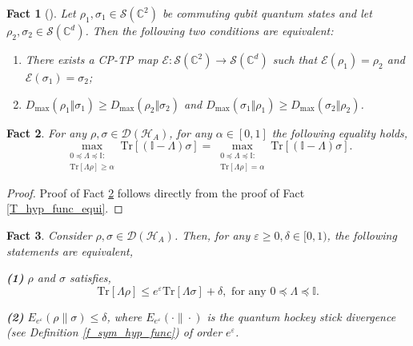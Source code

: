 \documentclass[onecolumn,ldraftcls, 11pt]{IEEEtran}
\newtheorem{fact}{Fact}
\newcommand{\tr}{\mathrm{Tr}}
\newcommand{\eps}{\varepsilon}
\newcommand*{\bbI}{\mathbb{I}}
\newcommand*{\cH}{\mathcal{H}}
\newcommand*{\cD}{\mathcal{D}}
\begin{document}
\begin{fact}[{\cite[Lemma $3.1$]{BST2019}}]\label{fact_state_trans}
Let $\rho_1, \sigma_1 \in \mathcal{S}(\mathbb{C}^2)$ be commuting qubit quantum states and 
let $\rho_2, \sigma_2 \in \mathcal{S}(\mathbb{C}^d)$.  
Then the following two conditions are equivalent:
\begin{enumerate}
    \item There exists a CP-TP map $\mathcal{E} : \mathcal{S}(\mathbb{C}^2) \to \mathcal{S}(\mathbb{C}^d)$ such that 
    $\mathcal{E}(\rho_1) = \rho_2$ and $\mathcal{E}(\sigma_1) = \sigma_2$;
    \item $D_{\max}(\rho_1 \Vert \sigma_1) \ge D_{\max}(\rho_2 \Vert \sigma_2)$ 
    and $D_{\max}(\sigma_1 \Vert \rho_1) \ge D_{\max}(\sigma_2 \Vert \rho_2)$.
\end{enumerate}
\end{fact}


\begin{fact}\label{T_hyp_func_equi2}
    For any $\rho,\sigma \in \cD(\cH_A)$, for any $\alpha \in [0,1]$ the following equality holds,
    \begin{equation}
        \max_{\substack{0 \preceq \Lambda \preceq \bbI:\\
        \tr[\Lambda \rho] \geq \alpha}} \tr[(\bbI - \Lambda)\sigma] = \max_{\substack{0 \preceq \Lambda \preceq \bbI:\\
        \tr[\Lambda \rho] = \alpha}} \tr[(\bbI - \Lambda)\sigma].\label{T_hyp_func_equi2_eq}
    \end{equation}
\end{fact}

\begin{proof}
    Proof of Fact \ref{T_hyp_func_equi2} follows directly from the proof of Fact \ref{T_hyp_func_equi}.
\end{proof}






\begin{fact}\label{fact_DP_hockey_rel}
    Consider $\rho,\sigma \in \cD(\cH_A)$. Then, for any $\eps \geq 0,\delta \in [0,1)$, the following statements are equivalent, 

    \textbf{(1)} $\rho$ and $\sigma$ satisfies,
    \begin{equation}
        \tr[\Lambda \rho] \leq e^{\eps} \tr[\Lambda \sigma]+ \delta, \mbox{~for any } 0 \preceq \Lambda \preceq \bbI. \label{fact_DP_hockey_rel_eq}
    \end{equation}

    \textbf{(2)} $ E_{e^\eps}(\rho\|\sigma) \leq \delta$, where $E_{e^\eps}(\cdot\|\cdot)$ is the quantum hockey stick divergence (see Definition \ref{f_sym_hyp_func}) of order $e^\eps$.
\end{fact}
\end{document}

